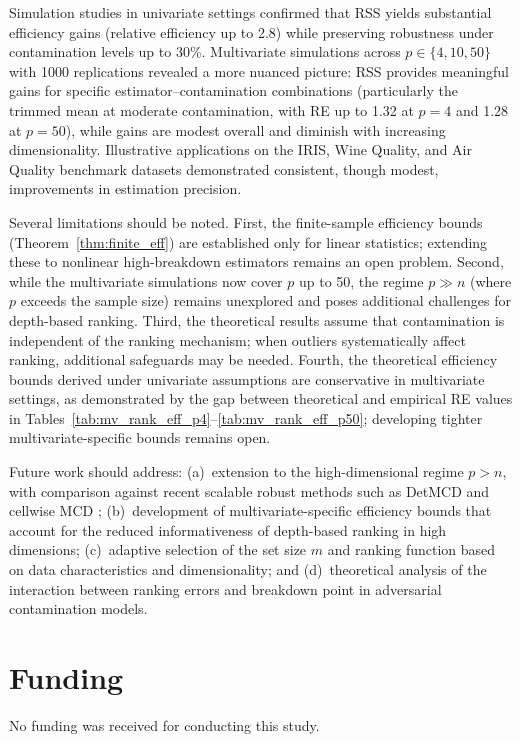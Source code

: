 \documentclass[12pt]{article}
\begin{document}
Simulation studies in univariate settings confirmed that RSS yields substantial efficiency gains (relative efficiency up to 2.8) while preserving robustness under contamination levels up to 30\%. Multivariate simulations across $p \in \{4, 10, 50\}$ with 1000 replications revealed a more nuanced picture: RSS provides meaningful gains for specific estimator--contamination combinations (particularly the trimmed mean at moderate contamination, with RE up to 1.32 at $p = 4$ and 1.28 at $p = 50$), while gains are modest overall and diminish with increasing dimensionality. Illustrative applications on the IRIS, Wine Quality, and Air Quality benchmark datasets demonstrated consistent, though modest, improvements in estimation precision.

Several limitations should be noted. First, the finite-sample efficiency bounds (Theorem~\ref{thm:finite_eff}) are established only for linear statistics; extending these to nonlinear high-breakdown estimators remains an open problem. Second, while the multivariate simulations now cover $p$ up to 50, the regime $p \gg n$ (where $p$ exceeds the sample size) remains unexplored and poses additional challenges for depth-based ranking. Third, the theoretical results assume that contamination is independent of the ranking mechanism; when outliers systematically affect ranking, additional safeguards may be needed. Fourth, the theoretical efficiency bounds derived under univariate assumptions are conservative in multivariate settings, as demonstrated by the gap between theoretical and empirical RE values in Tables~\ref{tab:mv_rank_eff_p4}--\ref{tab:mv_rank_eff_p50}; developing tighter multivariate-specific bounds remains open.

Future work should address: (a)~extension to the high-dimensional regime $p > n$, with comparison against recent scalable robust methods such as DetMCD \citep{Hubert2012} and cellwise MCD \citep{Raymaekers2023}; (b)~development of multivariate-specific efficiency bounds that account for the reduced informativeness of depth-based ranking in high dimensions; (c)~adaptive selection of the set size $m$ and ranking function based on data characteristics and dimensionality; and (d)~theoretical analysis of the interaction between ranking errors and breakdown point in adversarial contamination models.


\section*{Funding}
No funding was received for conducting this study.
\end{document}
